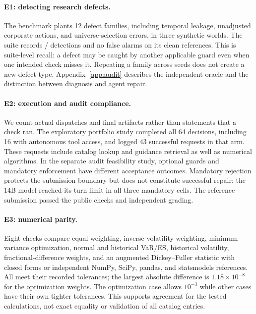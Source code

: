 \paragraph{E1: detecting research defects.}
The benchmark plants 12 defect families, including temporal leakage, unadjusted corporate
actions, and universe-selection errors, in three synthetic worlds. The suite records
\CaughtInstances{}/\DefectInstances{} detections and no false alarms on its clean
references. This is suite-level recall: a defect may be caught by another applicable
guard even when one intended check misses it. Repeating a family across seeds does not
create a new defect type. Appendix~\ref{app:audit} describes the independent oracle and
the distinction between diagnosis and agent repair.

\paragraph{E2: execution and audit compliance.}
We count actual dispatches and final artifacts rather than statements that a check ran.
The exploratory portfolio study completed all 64 decisions, including 16 with autonomous
tool access, and logged 43 successful requests in that arm. These requests include
catalog lookup and guidance retrieval as well as numerical algorithms. In the separate
audit feasibility study, optional guards and mandatory enforcement have different
acceptance outcomes. Mandatory rejection protects the submission boundary but does not
constitute successful repair: the 14B model reached its turn limit in all three mandatory
cells. The reference submission passed the public checks and independent grading.

\paragraph{E3: numerical parity.}
Eight checks compare equal weighting, inverse-volatility weighting, minimum-variance
optimization, normal and historical VaR/ES, historical volatility, fractional-difference
weights, and an augmented Dickey--Fuller statistic with closed forms or independent
NumPy, SciPy, pandas, and statsmodels references. All meet their recorded tolerances;
the largest absolute difference is $1.18\times10^{-8}$ for the optimization weights.
The optimization case allows $10^{-3}$ while other cases have their own tighter
tolerances. This supports agreement for the tested calculations, not exact equality
or validation of all catalog entries.

